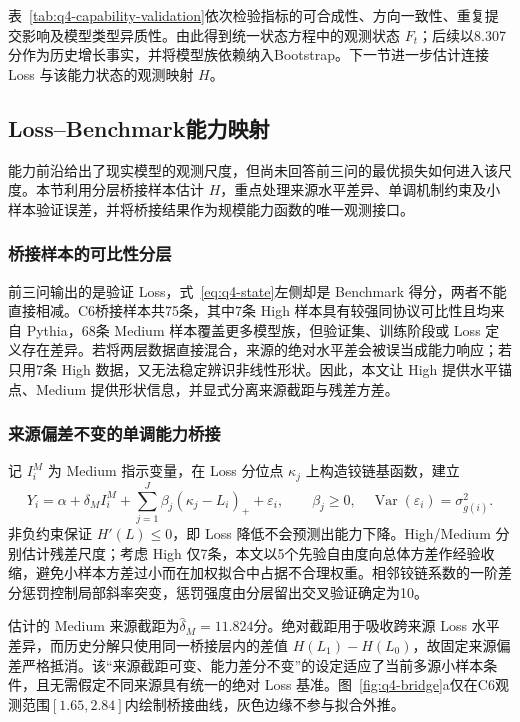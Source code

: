 表~\ref{tab:q4-capability-validation}依次检验指标的可合成性、方向一致性、重复提交影响及模型类型异质性。由此得到统一状态方程中的观测状态 $F_t$；后续以8.307分作为历史增长事实，并将模型族依赖纳入Bootstrap。下一节进一步估计连接 Loss 与该能力状态的观测映射 $H$。

\subsection{Loss--Benchmark能力映射}

能力前沿给出了现实模型的观测尺度，但尚未回答前三问的最优损失如何进入该尺度。本节利用分层桥接样本估计 $H$，重点处理来源水平差异、单调机制约束及小样本验证误差，并将桥接结果作为规模能力函数的唯一观测接口。

\subsubsection{桥接样本的可比性分层}

前三问输出的是验证 Loss，式~\eqref{eq:q4-state}左侧却是 Benchmark 得分，两者不能直接相减。C6桥接样本共75条，其中7条 High 样本具有较强同协议可比性且均来自 Pythia，68条 Medium 样本覆盖更多模型族，但验证集、训练阶段或 Loss 定义存在差异。若将两层数据直接混合，来源的绝对水平差会被误当成能力响应；若只用7条 High 数据，又无法稳定辨识非线性形状。因此，本文让 High 提供水平锚点、Medium 提供形状信息，并显式分离来源截距与残差方差。

\subsubsection{来源偏差不变的单调能力桥接}

记 $I_i^{M}$ 为 Medium 指示变量，在 Loss 分位点 $\kappa_j$ 上构造铰链基函数，建立
\begin{equation}
Y_i=\alpha+\delta_M I_i^{M}
+\sum_{j=1}^{J}\beta_j(\kappa_j-L_i)_++\varepsilon_i,
\qquad \beta_j\ge0,\quad
\operatorname{Var}(\varepsilon_i)=\sigma_{g(i)}^2.
\label{eq:q4-bridge}
\end{equation}
非负约束保证 $H'(L)\le0$，即 Loss 降低不会预测出能力下降。High/Medium 分别估计残差尺度；考虑 High 仅7条，本文以5个先验自由度向总体方差作经验收缩，避免小样本方差过小而在加权拟合中占据不合理权重。相邻铰链系数的一阶差分惩罚控制局部斜率突变，惩罚强度由分层留出交叉验证确定为10。

估计的 Medium 来源截距为$\widehat\delta_M=11.824$分。绝对截距用于吸收跨来源 Loss 水平差异，而历史分解只使用同一桥接层内的差值
$H(L_1)-H(L_0)$，故固定来源偏差严格抵消。该“来源截距可变、能力差分不变”的设定适应了当前多源小样本条件，且无需假定不同来源具有统一的绝对 Loss 基准。图~\ref{fig:q4-bridge}a仅在C6观测范围$[1.65,2.84]$内绘制桥接曲线，灰色边缘不参与拟合外推。

